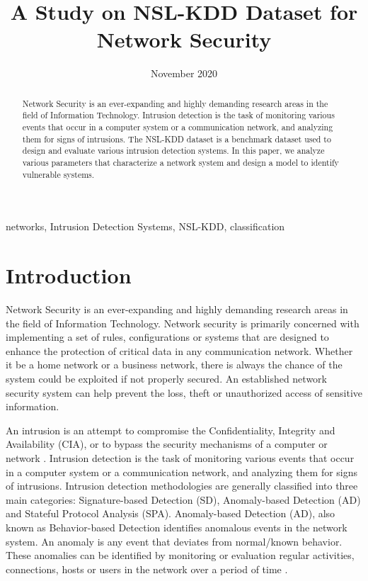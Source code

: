\documentclass[conference]{IEEEtran}
\title{A Study on NSL-KDD Dataset for Network Security}
\author{\IEEEauthorblockN{Rojina Deuja}
\IEEEauthorblockA{\textit{Department of Computer Science and Engineering} \\
\textit{University of Nebraska-Lincoln}\\
Lincoln, United States \\
rojinadeuja33g@gmail.com}}
\date{November 2020}
\begin{document}
\maketitle

\begin{abstract}
Network Security is an ever-expanding and highly demanding research areas in the field of Information Technology. Intrusion detection is the task of monitoring various events that occur in a computer system or a communication network, and analyzing them for signs of intrusions. The NSL-KDD dataset is a benchmark dataset used to design and evaluate various intrusion detection systems. In this paper, we analyze various parameters that characterize a network system and design a model to identify vulnerable systems.
\end{abstract}

\begin{IEEEkeywords}
networks, Intrusion Detection Systems, NSL-KDD, classification
\end{IEEEkeywords}

\section{Introduction}
Network Security is an ever-expanding and highly demanding research areas in the field of Information Technology. Network security is primarily concerned with implementing a set of rules, configurations or systems that are designed to enhance the protection of critical data in any communication network. Whether it be a home network or a business network, there is always the chance of the system could be exploited if not properly secured. An established network security system can help prevent the loss, theft or unauthorized access of sensitive information.

An intrusion is an attempt to compromise the Confidentiality, Integrity and Availability (CIA), or to bypass the security mechanisms of a computer or network \cite{b1}. Intrusion detection is the task of monitoring various events that occur in a computer system or a communication network, and analyzing them for signs of intrusions. Intrusion detection methodologies are generally classified into three main categories: Signature-based Detection (SD), Anomaly-based Detection (AD) and Stateful Protocol Analysis (SPA). Anomaly-based Detection (AD), also known as Behavior-based Detection identifies anomalous events in the network system. An anomaly is any event that deviates from normal/known behavior. These anomalies can be identified by monitoring or evaluation regular activities, connections, hosts or users in the network over a period of time \cite{b2}.
\end{document}
